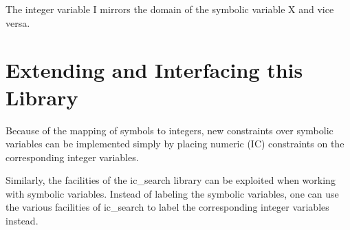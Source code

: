 The integer variable I mirrors the domain of the symbolic variable X and vice versa.

\section{Extending and Interfacing this Library}

Because of the mapping of symbols to integers, new constraints over
symbolic variables can be implemented simply by placing numeric (IC)
constraints on the corresponding integer variables.

Similarly, the facilities of the ic_search library can be exploited
when working with symbolic variables.  Instead of labeling the
symbolic variables, one can use the various facilities of ic_search to
label the corresponding integer variables instead.



